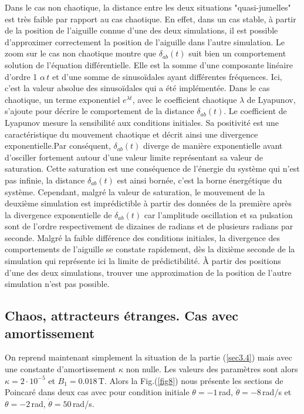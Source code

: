 \documentclass[a4paper,12pt,twoside]{article}
\begin{document}
Dans le cas non chaotique, la distance entre les deux situations "quasi-jumelles" est très faible par rapport au cas chaotique. En effet, dans un cas stable, à partir de la position de l'aiguille connue d'une des deux simulations, il est possible d'approximer correctement la position de l'aiguille dans l'autre simulation. Le zoom sur le cas non chaotique montre que $\delta _{ab}(t)$ suit bien un comportement solution de l'équation différentielle. Elle est la somme d'une composante linéaire d'ordre 1 $\alpha\,t$ et d'une somme de sinusoïdales ayant différentes fréquences. Ici, c'est la valeur absolue des sinusoïdales qui a été implémentée. Dans le cas chaotique, un terme exponentiel $e^{\lambda t}$, avec le coefficient chaotique $\lambda$ de Lyapunov, s'ajoute pour décrire le comportement de la distance $\delta _{ab}(t)$. Le coefficient de Lyapunov mesure la sensibilité aux conditions initiales. Sa positivité est une caractéristique du mouvement chaotique et décrit ainsi une divergence exponentielle.Par conséquent, $\delta _{ab}(t)$ diverge de manière exponentielle  avant d'osciller fortement autour d'une valeur limite représentant sa valeur de saturation. Cette saturation est une conséquence de l'énergie du système qui n'est pas infinie, la distance $\delta _{ab}(t)$ est ainsi bornée, c'est la borne énergétique du système. Cependant, malgré la valeur de saturation, le mouvement de la deuxième simulation est imprédictible à partir des données de la première après la divergence exponentielle de $\delta _{ab}(t)$ car l'amplitude oscillation et sa pulsation sont de l'ordre respectivement de dizaines de radians et de plusieurs radians par seconde. Malgré la faible différence des conditions initiales, la divergence des comportements de l'aiguille se constate rapidement, dès la dixième seconde de la simulation qui représente ici la limite de prédictibilité. À partir des positions d'une des deux simulations, trouver une approximation de la position de l'autre simulation n'est pas possible.

\subsection{Chaos, attracteurs étranges. Cas avec amortissement}

On reprend maintenant simplement la situation de la partie (\ref{sec3.4}) mais avec une constante d'amortissement $\kappa$ non nulle. Les valeurs des paramètres sont alors $\kappa=2\cdot10^{-5}$ et $B_1=0.018$\,T. Alors la Fig.(\ref{fig8}) nous présente les sections de Poincaré dans deux cas avec pour condition initiale $\theta=-1$\,rad, $\dot{\theta}=-8$\,rad/s et $\theta=-2$\,rad, $\dot{\theta}=50$\,rad/s.
\end{document}
